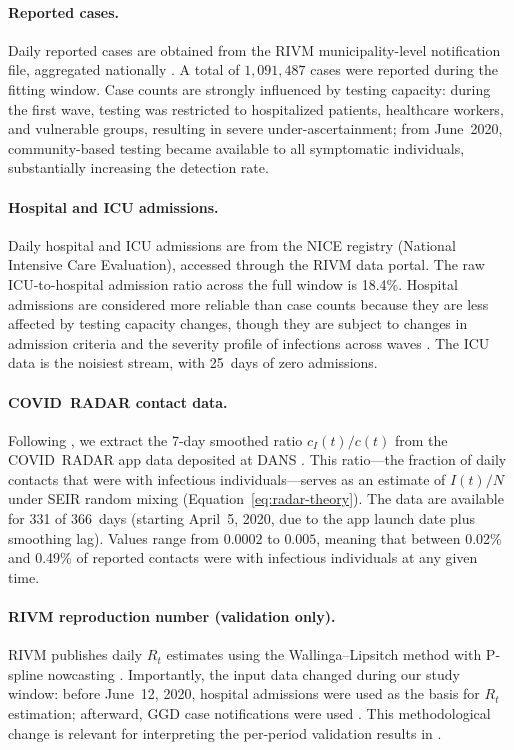 \documentclass[11pt]{article}
\begin{document}
\paragraph{Reported cases.} Daily reported cases are obtained from the RIVM municipality-level notification file, aggregated nationally \citep{Geubbels2023}. A total of $1{,}091{,}487$ cases were reported during the fitting window. Case counts are strongly influenced by testing capacity: during the first wave, testing was restricted to hospitalized patients, healthcare workers, and vulnerable groups, resulting in severe under-ascertainment; from June~2020, community-based testing became available to all symptomatic individuals, substantially increasing the detection rate.

\paragraph{Hospital and ICU admissions.} Daily hospital and ICU admissions are from the NICE registry (National Intensive Care Evaluation), accessed through the RIVM data portal. The raw ICU-to-hospital admission ratio across the full window is 18.4\%. Hospital admissions are considered more reliable than case counts because they are less affected by testing capacity changes, though they are subject to changes in admission criteria and the severity profile of infections across waves \citep{Dongelmans2022}. The ICU data is the noisiest stream, with 25~days of zero admissions.

\paragraph{COVID~RADAR contact data.} Following \citet{SchootUiterkamp2025}, we extract the 7-day smoothed ratio $c_I(t)/c(t)$ from the COVID~RADAR app data deposited at DANS \citep{vanDijk2020}. This ratio---the fraction of daily contacts that were with infectious individuals---serves as an estimate of $I(t)/N$ under SEIR random mixing (Equation~\eqref{eq:radar-theory}). The data are available for 331 of 366~days (starting April~5, 2020, due to the app launch date plus smoothing lag). Values range from $0.0002$ to $0.005$, meaning that between 0.02\% and 0.49\% of reported contacts were with infectious individuals at any given time.

\paragraph{RIVM reproduction number (validation only).} RIVM publishes daily $R_t$ estimates using the Wallinga--Lipsitch method \citep{WallingaLipsitch2007} with P-spline nowcasting \citep{vandeKassteele2019}. Importantly, the input data changed during our study window: before June~12, 2020, hospital admissions were used as the basis for $R_t$ estimation; afterward, GGD case notifications were used \citep{Geubbels2023}. This methodological change is relevant for interpreting the per-period validation results in .
\end{document}
